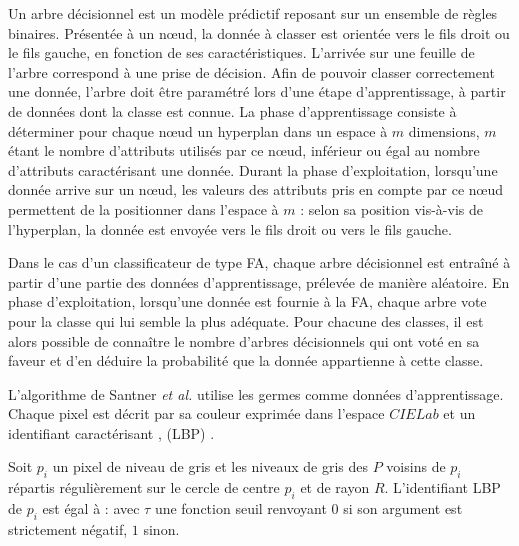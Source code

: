 Un arbre décisionnel est un modèle prédictif reposant sur un ensemble de règles binaires. Présentée à un nœud, la donnée à classer est orientée vers le fils droit ou le fils gauche, en fonction de ses caractéristiques. L’arrivée sur une feuille de l’arbre correspond à une prise de décision. Afin de pouvoir classer correctement une donnée, l’arbre doit être paramétré lors d’une étape d’apprentissage, à partir de données dont la classe est connue. La phase d’apprentissage consiste à déterminer pour chaque nœud un hyperplan dans un espace à $m$ dimensions, $m$ étant le nombre d’attributs utilisés par ce nœud, inférieur ou égal au nombre d’attributs caractérisant une donnée. Durant la phase d’exploitation, lorsqu’une donnée arrive sur un nœud, les valeurs des attributs pris en compte par ce nœud permettent de la positionner dans l’espace à $m$  : selon sa position vis-à-vis de l’hyperplan, la donnée est envoyée vers le fils droit ou vers le fils gauche.

Dans le cas d’un classificateur de type FA, chaque arbre décisionnel est entraîné à partir d’une partie des données d’apprentissage, prélevée de manière aléatoire. En phase d’exploitation, lorsqu’une donnée est fournie à la FA, chaque arbre vote pour la classe qui lui semble la plus adéquate.
Pour chacune des classes, il est alors possible de connaître le nombre d’arbres décisionnels qui ont voté en sa faveur et d’en déduire la probabilité que la donnée appartienne à cette classe.


L'algorithme de Santner \textit{et al.} utilise les germes comme données d'apprentissage. Chaque pixel est décrit par sa couleur exprimée dans l'espace $CIELab$ et un identifiant caractérisant ,  (LBP) \cite{ojala2002multiresolution}.

Soit $p_{i}$ un pixel de niveau de gris  et  les niveaux de gris des $P$  voisins de $p_{i}$ répartis régulièrement sur le cercle de centre $p_{i}$ et de rayon $R$. L'identifiant LBP de $p_{i}$ est égal à : 
avec  $\tau$ une fonction seuil renvoyant $0$ si son argument est strictement négatif, $1$ sinon.

